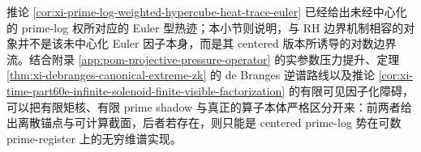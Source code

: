 \noindent
推论 \ref{cor:xi-prime-log-weighted-hypercube-heat-trace-euler} 已经给出未经中心化的 prime-log 权所对应的 Euler 型热迹；本小节则说明，与 RH 边界机制相容的对象并不是该未中心化 Euler 因子本身，而是其 centered 版本所诱导的对数边界流。结合附录 \ref{app:pom-projective-pressure-operator} 的实参数压力提升、定理 \ref{thm:xi-debranges-canonical-extreme-zk} 的 de Branges 逆谱路线以及推论 \ref{cor:xi-time-part60e-infinite-solenoid-finite-visible-factorization} 的有限可见因子化障碍，可以把有限矩核、有限 prime shadow 与真正的算子本体严格区分开来：前两者给出离散锚点与可计算截面，后者若存在，则只能是 centered prime-log 势在可数 prime-register 上的无穷维谱实现。

\endinput
